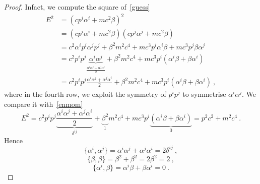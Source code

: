     \begin{proof}
        Infact, we compute the square of~\eqref{guess}
        \begin{equation*}
        \begin{aligned}
            E^2 & = (c p^i \alpha^i + m c^2 \beta)^2 \\ & = (c p^i \alpha^i + m c^2 \beta) (c p^j \alpha^j + m c^2 \beta) \\ & = c^2 \alpha^i p^i \alpha^j p^j + \beta^2 m^2 c^4 + m c^3 p^i \alpha^i \beta + m c^3 p^j \beta \alpha^j \\ & = c^2 p^i p^j \underbrace{\alpha^i \alpha^j}_{\frac{\alpha^i \alpha^j + \alpha^j \alpha^i}{2}} + \beta^2 m^2 c^4 + m c^3 p^i (\alpha^i \beta + \beta \alpha^i) \\ & = c^2 p^i p^j \frac{\alpha^i \alpha^j + \alpha^j \alpha^i}{2} + \beta^2 m^2 c^4 + m c^3 p^i (\alpha^i \beta + \beta \alpha^i) ~,
        \end{aligned}
        \end{equation*}
        where in the fourth row, we exploit the symmetry of $p^i p^j$ to symmetrise $\alpha^i \alpha^j$. We compare it with~\eqref{enmom}
        \begin{equation*}
            E^2 = c^2 p^i p^j \underbrace{\frac{\alpha^i \alpha^j + \alpha^j \alpha^i}{2}}_{\delta^{ij}} + \underbrace{\beta^2}_{1} m^2 c^4 + m c^3 p^i \underbrace{(\alpha^i \beta + \beta \alpha^i)}_{0} = p^2 c^2 + m^2 c^4 ~.
        \end{equation*}
        Hence
        \begin{equation*}
            \{\alpha^i, \alpha^j\} = \alpha^i \alpha^j + \alpha^j \alpha^i = 2 \delta^{ij} ~,
        \end{equation*}
        \begin{equation*}
            \{\beta, \beta\} = \beta^2 + \beta^2 = 2 \beta^2 = 2 ~,
        \end{equation*}
        \begin{equation*}
            \{\alpha^i, \beta\} = \alpha^i \beta + \beta \alpha^i = 0 ~.
        \end{equation*}
    \end{proof}


